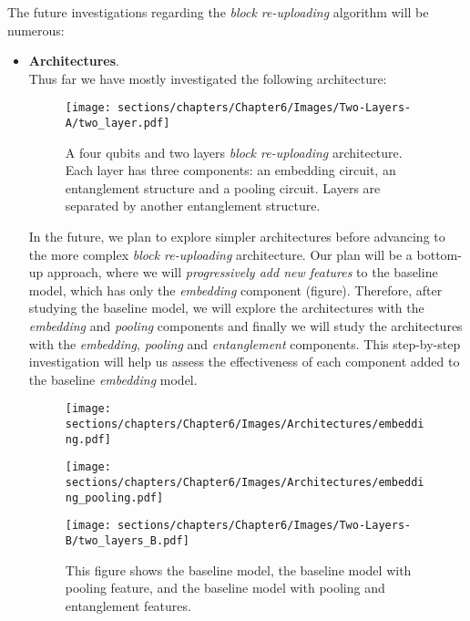 
The future investigations regarding the \textit{block re-uploading} algorithm will be numerous:

\begin{itemize}
    \item \textbf{Architectures}.\\
    Thus far we have mostly investigated the following architecture:

    \begin{figure}[h]
        \centering
        \texttt{[image: sections/chapters/Chapter6/Images/Two-Layers-A/two\_layer.pdf]}
        \caption{A four qubits and two layers \textit{block re-uploading} architecture. Each layer has three 
        components: an embedding circuit, an entanglement structure and a pooling circuit.
        Layers are separated by another entanglement structure.}
    \end{figure}

    In the future, we plan to explore simpler architectures before advancing to the more 
    complex \textit{block re-uploading} architecture. 
    Our plan will be a bottom-up approach, where we will \textit{progressively add new features} to the baseline model, 
    which has only the \textit{embedding} component (figure).
    Therefore, after studying the baseline model, we will explore the architectures with the 
    \textit{embedding} and \textit{pooling} components and finally we will study the architectures 
    with the \textit{embedding}, \textit{pooling} and \textit{entanglement} components.
    This step-by-step investigation will 
    help us assess the effectiveness of each component added to the baseline \textit{embedding} model.

    \begin{figure}[h]
        \centering
        \begin{minipage}{0.45\textwidth}
            \centering
            \texttt{[image: sections/chapters/Chapter6/Images/Architectures/embedding.pdf]}
        \end{minipage}
        \hfill
        \begin{minipage}{0.45\textwidth}
            \centering
            \texttt{[image: sections/chapters/Chapter6/Images/Architectures/embedding\_pooling.pdf]}
        \end{minipage}
        \vspace{0.5cm} 
        \begin{minipage}{\textwidth}
            \centering
            \texttt{[image: sections/chapters/Chapter6/Images/Two-Layers-B/two\_layers\_B.pdf]}
        \end{minipage}
        \caption{This figure shows the baseline model, the baseline model with pooling feature, and 
        the baseline model with pooling and entanglement features.}
    \end{figure}


\end{itemize}
